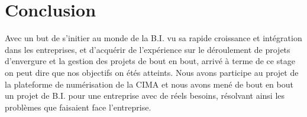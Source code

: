 \chapter*{Conclusion}%
%
Avec un but de s’initier au monde de la B.I. vu sa rapide croissance et intégration dans les entreprises, et d’acquérir de l’expérience sur le déroulement de projets d’envergure et la gestion des projets de bout en bout, arrivé à terme de ce stage on peut dire que nos objectifs on étés atteints. Nous avons participe au projet de la plateforme de numérisation de la CIMA et nous avons mené de bout en bout un projet de B.I. pour une entreprise avec de réels besoins, résolvant ainsi les problèmes que faisaient face l’entreprise. 

